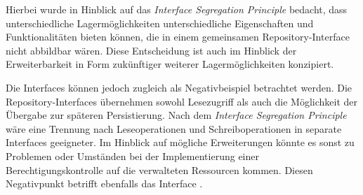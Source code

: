 Hierbei wurde in Hinblick auf das \textit{Interface Segregation Principle} bedacht, dass unterschiedliche Lagermöglichkeiten unterschiedliche Eigenschaften und Funktionalitäten bieten können, die in einem gemeinsamen Repository-Interface nicht abbildbar wären.
Diese Entscheidung ist auch im Hinblick der Erweiterbarkeit in Form zukünftiger weiterer Lagermöglichkeiten konzipiert.

Die Interfaces können jedoch zugleich als Negativbeispiel betrachtet werden.
Die Repository-Interfaces übernehmen sowohl Lesezugriff als auch die Möglichkeit der Übergabe zur späteren Persistierung.
Nach dem \textit{Interface Segregation Principle} wäre eine Trennung nach Leseoperationen und Schreiboperationen in separate Interfaces geeigneter.
Im Hinblick auf mögliche Erweiterungen könnte es sonst zu Problemen oder Umständen bei der Implementierung einer Berechtigungskontrolle auf die verwalteten Ressourcen kommen.
Diesen Negativpunkt betrifft ebenfalls das Interface \href{https://github.com/lucasmerkel/dhbw-advancedswe-programmentwurf/blob/5764d7da4cfd0562ed8e96128e92f85c30b7309d/swe_programmentwurf/consumergoods-inventory-planner/3-cip-domain/src/main/java/de/dhbw/cip/domain/ConsumerGoodsRepository.java}{}.

